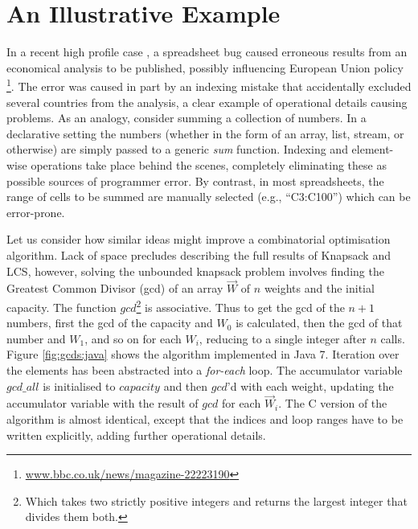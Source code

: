 \section{An Illustrative Example}
In a recent high profile case \cite{Herndon13}, a spreadsheet bug caused
erroneous results from an economical analysis to be published, possibly
influencing European Union policy%
\footnote{\url{www.bbc.co.uk/news/magazine-22223190}}.
The error was caused in part by an indexing mistake that accidentally excluded
several countries from the analysis, a clear example of operational details causing
problems.
As an analogy, consider summing a collection of numbers. In a declarative
setting
the numbers (whether in the form of an array, list, stream, or
otherwise) are simply passed to a generic \emph{sum} function. Indexing and
element-wise operations take place behind the scenes, completely eliminating
these as possible sources of programmer error. By contrast, in most spreadsheets, the range of cells to
be summed are manually selected (e.g., ``C3:C100'') which can be error-prone.


Let us consider how similar ideas might improve a combinatorial
optimisation algorithm. 
Lack of space precludes describing the full results of Knapsack and LCS, however, solving the unbounded knapsack problem involves finding the Greatest Common Divisor (gcd) of an array $\vec{W}$ of $n$
weights and the initial capacity. The function $gcd$\footnote{Which takes two strictly positive integers and returns the largest integer that divides them both.}
is associative. Thus to get the gcd of the $n+1$ numbers, first the gcd of the capacity and $W_0$ is calculated, then the gcd of that number and $W_1$, and so on for each $W_i$,
reducing to a single integer after $n$ calls. Figure \ref{fig:gcds:java} shows
the algorithm implemented in Java 7. Iteration over the elements has been
abstracted into a \emph{for-each} loop. The accumulator variable $gcd\_all$ is initialised to $capacity$ and then $gcd$'d with each weight, updating the accumulator
variable with the result of $gcd$ for each $\vec{W}_i$. The C version of
the algorithm is almost identical, except that the indices and loop ranges have to be written explicitly, adding further
operational details.


